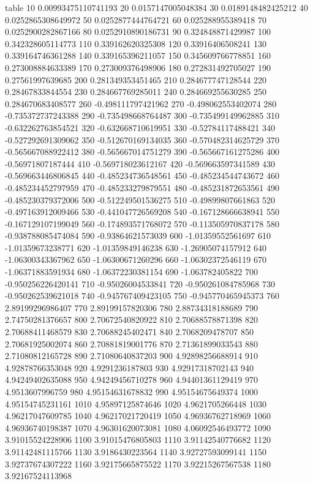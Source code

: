 table {%
10 0.00993475110741193
20 0.0157147005048384
30 0.0189148482425212
40 0.0252865308649972
50 0.0252877444764721
60 0.025288955389418
70 0.0252900282867166
80 0.0252910890186731
90 0.324848871429987
100 0.342328605114773
110 0.339162620325308
120 0.33916406508241
130 0.339164746361288
140 0.339165396211057
150 0.345609766778851
160 0.273008884633389
170 0.273009376498906
180 0.272831492705027
190 0.27561997639685
200 0.281349353451465
210 0.284677747128544
220 0.28467833844554
230 0.284667769285011
240 0.284669255630285
250 0.284670683408577
260 -0.498111797421962
270 -0.498062553402074
280 -0.735372737243388
290 -0.735498668764487
300 -0.735499149962885
310 -0.632262763854521
320 -0.632668710619951
330 -0.52784117488421
340 -0.527292691309062
350 -0.512670169134035
360 -0.570482314625729
370 -0.565667088922412
380 -0.565667014751279
390 -0.565667161275286
400 -0.56971807187444
410 -0.569718023612167
420 -0.569663597341589
430 -0.569663446806845
440 -0.485234736548561
450 -0.485234544743672
460 -0.485234452797959
470 -0.485233279879551
480 -0.485231872653561
490 -0.485230379372006
500 -0.512249501536275
510 -0.49899807661863
520 -0.497163912009466
530 -0.441047726569208
540 -0.167128666638941
550 -0.167129107199049
560 -0.174893571768072
570 -0.113505970837178
580 -0.938788085474084
590 -0.93864621573039
600 -1.01359552561697
610 -1.01359673238771
620 -1.01359849146238
630 -1.26905074157912
640 -1.06300343367962
650 -1.06300671260296
660 -1.06302372546119
670 -1.06371883591934
680 -1.06372230381154
690 -1.063782405822
700 -0.950256226420141
710 -0.95026004533841
720 -0.950261084785968
730 -0.950262539621018
740 -0.945767409423105
750 -0.945770465945373
760 2.89199296986407
770 2.89199157820306
780 2.88734318188689
790 2.74750281376657
800 2.70672540820922
810 2.70688578871398
820 2.70688411468579
830 2.70688245402471
840 2.7068209478707
850 2.70681925002074
860 2.70881819001776
870 2.71361899033543
880 2.71080812165728
890 2.71080640837203
900 4.92898256688914
910 4.92878766353048
920 4.9291236187803
930 4.92917318702143
940 4.94249402635088
950 4.94249456710278
960 4.94401361129419
970 4.9513607996759
980 4.95154631678832
990 4.95154675649374
1000 4.95154745231161
1010 4.95897125874646
1020 4.9621705266448
1030 4.96217047609785
1040 4.96217021720419
1050 4.96936762718969
1060 4.96936740198387
1070 4.96301620073081
1080 4.06092546493772
1090 3.91015524228906
1100 3.91015476805803
1110 3.91142540776682
1120 3.91142481115766
1130 3.9186430223564
1140 3.92727593099141
1150 3.92737674307222
1160 3.92175665875522
1170 3.92215267567538
1180 3.92167524113968
}
